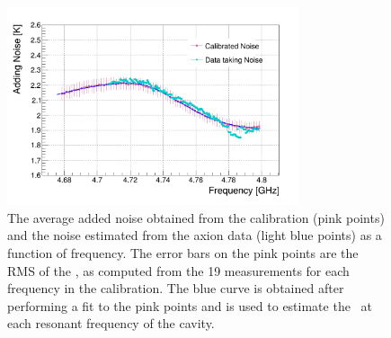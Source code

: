 \begin{figure} [htbp]
  \centering
  \includegraphics[width=8.6cm]{figures/Avg_Noise_vs_Freq_run1to19_211118.png}
  \caption{The average added noise obtained from the calibration (pink points)
 and the noise estimated from the axion data (light blue points) as a 
function of frequency. The error bars on the pink points are the RMS 
of the \ta, as computed from the 19 measurements for each frequency 
in the calibration. 
The blue curve is obtained after performing a fit to 
the pink points and is used to estimate the \ta\ at each resonant 
frequency of the cavity.}
  \label{fig:hemtcalvsf}
\end{figure}


  

